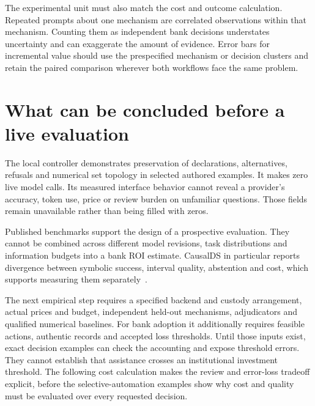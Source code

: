 The experimental unit must also match the cost and outcome calculation.
Repeated prompts about one mechanism are correlated observations within that
mechanism. Counting them as independent bank decisions understates uncertainty
and can exaggerate the amount of evidence. Error bars for incremental value
should use the prespecified mechanism or decision clusters and retain the
paired comparison wherever both workflows face the same problem.

\section{What can be concluded before a live evaluation}

The local controller demonstrates preservation of declarations, alternatives,
refusals and numerical set topology in selected authored examples. It makes
zero live model calls. Its measured interface behavior cannot reveal a
provider's accuracy, token use, price or review burden on unfamiliar questions.
Those fields remain unavailable rather than being filled with zeros.

Published benchmarks support the design of a prospective evaluation. They
cannot be combined across different model revisions, task distributions and
information budgets into a bank ROI estimate. CausalDS in particular reports
divergence between symbolic success, interval quality, abstention and cost,
which supports measuring them separately~\citep{v12_la_2607_08093}.

The next empirical step requires a specified backend and custody arrangement,
actual prices and budget, independent held-out mechanisms, adjudicators and
qualified numerical baselines. For bank adoption it additionally requires
feasible actions, authentic records and accepted loss thresholds. Until those
inputs exist, exact decision examples can check the accounting and expose
threshold errors. They cannot establish that assistance crosses an institutional
investment threshold. The following cost calculation makes the review and error-loss tradeoff explicit, before the selective-automation examples show why cost and quality must be evaluated over every requested decision.
